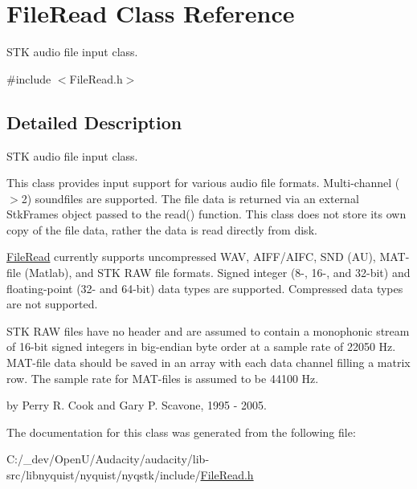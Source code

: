 \hypertarget{class_file_read}{}\section{File\+Read Class Reference}
\label{class_file_read}


S\+TK audio file input class.  




{\ttfamily \#include $<$File\+Read.\+h$>$}



\subsection{Detailed Description}
S\+TK audio file input class. 

This class provides input support for various audio file formats. Multi-\/channel ($>$2) soundfiles are supported. The file data is returned via an external Stk\+Frames object passed to the read() function. This class does not store its own copy of the file data, rather the data is read directly from disk.

\hyperlink{class_file_read}{File\+Read} currently supports uncompressed W\+AV, A\+I\+F\+F/\+A\+I\+FC, S\+ND (AU), M\+A\+T-\/file (Matlab), and S\+TK R\+AW file formats. Signed integer (8-\/, 16-\/, and 32-\/bit) and floating-\/point (32-\/ and 64-\/bit) data types are supported. Compressed data types are not supported.

S\+TK R\+AW files have no header and are assumed to contain a monophonic stream of 16-\/bit signed integers in big-\/endian byte order at a sample rate of 22050 Hz. M\+A\+T-\/file data should be saved in an array with each data channel filling a matrix row. The sample rate for M\+A\+T-\/files is assumed to be 44100 Hz.

by Perry R. Cook and Gary P. Scavone, 1995 -\/ 2005. 

The documentation for this class was generated from the following file\+:\begin{DoxyCompactItemize}
\item 
C\+:/\+\_\+dev/\+Open\+U/\+Audacity/audacity/lib-\/src/libnyquist/nyquist/nyqstk/include/\hyperlink{_file_read_8h}{File\+Read.\+h}\end{DoxyCompactItemize}
